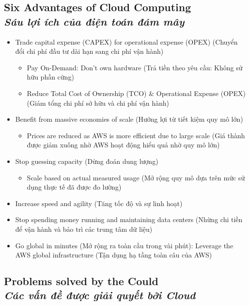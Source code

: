 \subsection[Six Advantages of Cloud Computing]{Six Advantages of Cloud Computing \\
	\textit{Sáu lợi ích của điện toán đám mây}}
	\begin{itemize}
		\item Trade capital expense (CAPEX) for operational expense (OPEX) (Chuyển đổi chi phí đầu tư dài hạn sang chi phí vận hành)
		\begin{itemize}
			\item Pay On-Demand: Don't own hardware (Trả tiền theo yêu cầu: Không sử hữu phần cứng)
			\item Reduce Total Cost of Ownership (TCO) \& Operational Expense (OPEX) (Giảm tổng chi phí sở hữu và chi phí vận hành)
		\end{itemize}
				\item Benefit from massive economies of scale (Hưởng lợi từ tiết kiệm quy mô lớn)
		\begin{itemize}
			\item Prices are reduced as AWS is more efficient due to large scale (Giá thành được giảm xuống nhờ AWS hoạt động hiểu quả nhờ quy mô lớn)
		\end{itemize}
		\item Stop guessing capacity  (Dừng đoán dung lượng)
		\begin{itemize}
			\item Scale based on actual measured usage (Mở rộng quy mô dựa trên mức sử dụng thực tế đã được đo lường)
		\end{itemize}
		\item Increase speed and agility (Tăng tốc độ và sự linh hoạt)
		\item Stop spending money running and maintaining data centers (Nhừng chi tiền để vận hành và bảo trì các trung tâm dữ liệu)
		\item Go global in minutes (Mở rộng ra toàn cầu trong vài phút): Leverage the AWS global infrastructure (Tận dụng hạ tầng toàn câu của AWS)
	\end{itemize}

\subsection[Problems solved by the Could]{Problems solved by the Could \\
	\textit{Các vấn đề được giải quyết bởi Cloud}}
	
